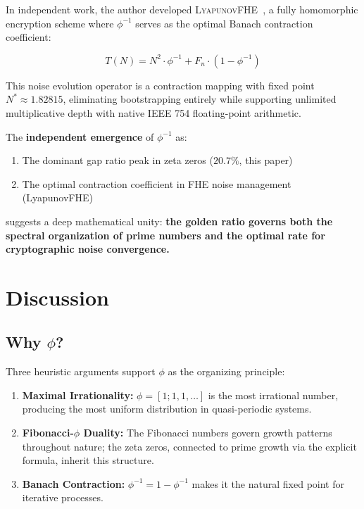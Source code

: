 \documentclass[11pt,a4paper]{article}
\begin{document}
In independent work, the author developed \textsc{LyapunovFHE}~\cite{fernandez2026fhe}, a fully homomorphic encryption scheme where $\phi^{-1}$ serves as the optimal Banach contraction coefficient:

\begin{equation}
T(N) = N^2 \cdot \phi^{-1} + F_n \cdot (1 - \phi^{-1})
\end{equation}

This noise evolution operator is a contraction mapping with fixed point $N^* \approx 1.82815$, eliminating bootstrapping entirely while supporting unlimited multiplicative depth with native IEEE 754 floating-point arithmetic.

The \textbf{independent emergence} of $\phi^{-1}$ as:
\begin{enumerate}[leftmargin=*,itemsep=2pt]
    \item The dominant gap ratio peak in zeta zeros ($20.7\%$, this paper)
    \item The optimal contraction coefficient in FHE noise management (LyapunovFHE)
\end{enumerate}
suggests a deep mathematical unity: \textbf{the golden ratio governs both the spectral organization of prime numbers and the optimal rate for cryptographic noise convergence.}

\newpage

\section{Discussion}
\label{sec:discussion}

\subsection{Why $\phi$?}

Three heuristic arguments support $\phi$ as the organizing principle:
\begin{enumerate}[leftmargin=*,itemsep=2pt]
    \item \textbf{Maximal Irrationality:} $\phi = [1;1,1,\ldots]$ is the most irrational number, producing the most uniform distribution in quasi-periodic systems.
    \item \textbf{Fibonacci-$\phi$ Duality:} The Fibonacci numbers govern growth patterns throughout nature; the zeta zeros, connected to prime growth via the explicit formula, inherit this structure.
    \item \textbf{Banach Contraction:} $\phi^{-1} = 1 - \phi^{-1}$ makes it the natural fixed point for iterative processes.
\end{enumerate}
\end{document}
